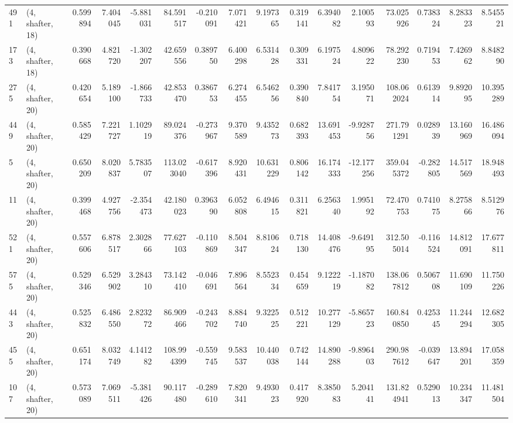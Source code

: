 \begin{tabular}{llrrrrrrrrrrrrrr}
491 &  (4, shafter, 18) &   0.599894 &   7.404045 &  -5.881031 &    84.591517 &  -0.210091 &   7.071421 &   9.197365 &  0.319141 &   6.394082 &   2.100593 &    73.025926 &  0.738324 &   8.283323 &   8.545521 \\
173 &  (4, shafter, 18) &   0.390668 &   4.821720 &  -1.302207 &    42.659556 &   0.389750 &   6.400298 &   6.531428 &  0.309331 &   6.197524 &   4.809622 &    78.292230 &  0.719453 &   7.426962 &   8.848290 \\
275 &  (4, shafter, 20) &   0.420654 &   5.189100 &  -1.866733 &    42.853470 &   0.386753 &   6.274455 &   6.546256 &  0.390840 &   7.841754 &   3.195071 &   108.062024 &  0.613914 &   9.892095 &  10.395289 \\
449 &  (4, shafter, 20) &   0.585429 &   7.221727 &   1.102919 &    89.024376 &  -0.273967 &   9.370589 &   9.435273 &  0.682393 &  13.691453 &  -9.928756 &   271.791291 &  0.028939 &  13.160969 &  16.486094 \\
5   &  (4, shafter, 20) &   0.650209 &   8.020837 &   5.783507 &   113.023040 &  -0.617396 &   8.920431 &  10.631229 &  0.806142 &  16.174333 & -12.177256 &   359.045372 & -0.282805 &  14.517569 &  18.948493 \\
11  &  (4, shafter, 20) &   0.399468 &   4.927756 &  -2.354473 &    42.180023 &   0.396390 &   6.052808 &   6.494615 &  0.311821 &   6.256340 &   1.995192 &    72.470753 &  0.741075 &   8.275866 &   8.512976 \\
521 &  (4, shafter, 20) &   0.557606 &   6.878517 &   2.302866 &    77.627103 &  -0.110869 &   8.504347 &   8.810624 &  0.718130 &  14.408476 &  -9.649195 &   312.505014 & -0.116524 &  14.812091 &  17.677811 \\
575 &  (4, shafter, 20) &   0.529346 &   6.529902 &   3.284310 &    73.142410 &  -0.046691 &   7.896564 &   8.552334 &  0.454659 &   9.122219 &  -1.187082 &   138.067812 &  0.506708 &  11.690109 &  11.750226 \\
443 &  (4, shafter, 20) &   0.525832 &   6.486550 &   2.823272 &    86.909466 &  -0.243702 &   8.884740 &   9.322525 &  0.512221 &  10.277129 &  -5.865723 &   160.840850 &  0.425345 &  11.244294 &  12.682305 \\
455 &  (4, shafter, 20) &   0.651174 &   8.032749 &   4.141282 &   108.994399 &  -0.559745 &   9.583537 &  10.440038 &  0.742144 &  14.890288 &  -9.896403 &   290.987612 & -0.039647 &  13.894201 &  17.058359 \\
107 &  (4, shafter, 20) &   0.573089 &   7.069511 &  -5.381426 &    90.117480 &  -0.289610 &   7.820341 &   9.493023 &  0.417920 &   8.385083 &   5.204141 &   131.824941 &  0.529013 &  10.234347 &  11.481504 \\

\end{tabular}
